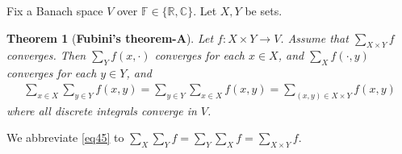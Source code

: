 \documentclass[12pt,b5paper,notitlepage]{article}
\theoremstyle{definition}
\theoremstyle{plain}
\newtheorem{thm}[df]{Theorem}
\newcommand{\Cbb}{\mathbb C}
\newcommand{\Rbb}{\mathbb R}
\newcommand{\Fbb}{\mathbb F}
\numberwithin{equation}{section}
\begin{document}
Fix a Banach space $V$ over $\Fbb\in\{\Rbb,\Cbb\}$. Let $X,Y$ be sets.

\begin{thm}[\textbf{Fubini's theorem-A}]\label{lb135} 
Let $f:X\times Y\rightarrow V$. Assume that $\sum_{X\times Y}f$ converges. Then $\sum_Y f(x,\cdot)$ converges for each $x\in X$, and $\sum_X f(\cdot,y)$ converges for each $y\in Y$, and 
\begin{align}\label{eq45}
\sum_{x\in X}\sum_{y\in Y}f(x,y)=\sum_{y\in Y}\sum_{x\in X}f(x,y)=\sum_{(x,y)\in X\times Y}f(x,y)
\end{align}
where all discrete integrals converge in $V$.
\end{thm}

We abbreviate \eqref{eq45} to $\sum_X\sum_Yf=\sum_Y\sum_Xf=\sum_{X\times Y}f$.
\end{document}
